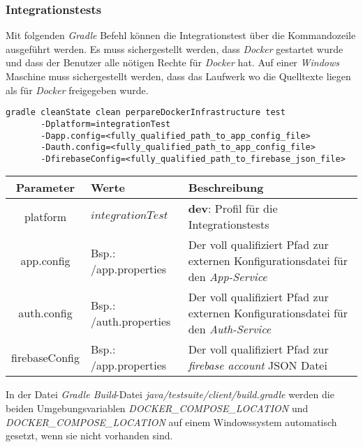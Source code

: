 \documentclass[]{article}
\begin{document}
{{{\subsubsection{Integrationstests}
Mit folgenden \emph{Gradle} Befehl können die Integrationstest über die Kommandozeile ausgeführt werden. Es muss sichergestellt werden, dass \emph{Docker} gestartet wurde und dass der Benutzer alle nötigen Rechte für \emph{Docker} hat. Auf einer \emph{Windows} Maschine muss sichergestellt werden, dass das Laufwerk wo die Quelltexte liegen als für \emph{Docker} freigegeben wurde. 
\begin{verbatim}
gradle cleanState clean perpareDockerInfrastructure test
       -Dplatform=integrationTest
       -Dapp.config=<fully_qualified_path_to_app_config_file> 
       -Dauth.config=<fully_qualified_path_to_app_config_file> 
       -DfirebaseConfig=<fully_qualified_path_to_firebase_json_file>
\end{verbatim}
{\renewcommand{\arraystretch}{2}%
\begin{center}
	\begin{tabular}{| c | l | p{7cm} |}
		\hline
		\textbf{Parameter} & \textbf{Werte} & \textbf{Beschreibung}  \\ \hline
		platform & $integrationTest$ & \textbf{dev}: Profil für die Integrationstests\\ \hline
		app.config & Bsp.: /app.properties & Der voll qualifiziert Pfad zur externen Konfigurationsdatei für den \emph{App-Service}  \\ \hline
		auth.config & Bsp.: /auth.properties & Der voll qualifiziert Pfad zur externen Konfigurationsdatei für den \emph{Auth-Service}  \\ \hline
		firebaseConfig & Bsp.: /app.properties & Der voll qualifiziert Pfad zur 
		\emph{firebase account} JSON Datei  \\ \hline
	\end{tabular}
\end{center}
In der Datei \emph{Gradle Build}-Datei \emph{java/testsuite/client/build.gradle} werden die beiden Umgebungsvariablen \emph{DOCKER\_COMPOSE\_LOCATION} und  \emph{DOCKER\_COMPOSE\_LOCATION} auf einem Windowssystem  automatisch gesetzt, wenn sie nicht vorhanden sind.

}}}}
\end{document}
